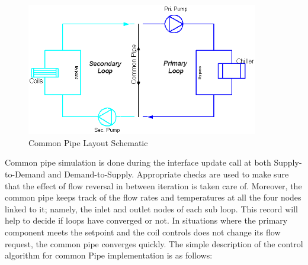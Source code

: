 \begin{figure}[hbtp] %
\centering
\includegraphics[width=0.9\textwidth, height=0.9\textheight, keepaspectratio=true]{media/image1975.png}
\caption{Common Pipe Layout Schematic \protect \label{fig:common-pipe-layout-schematic}}
\end{figure}

Common pipe simulation is done during the interface update call at both Supply-to-Demand and Demand-to-Supply. Appropriate checks are used to make sure that the effect of flow reversal in between iteration is taken care of. Moreover, the common pipe keeps track of the flow rates and temperatures at all the four nodes linked to it; namely, the inlet and outlet nodes of each sub loop. This record will help to decide if loops have converged or not. In situations where the primary component meets the setpoint and the coil controls does not change its flow request, the common pipe converges quickly. The simple description of the control algorithm for common Pipe implementation is as follows:

